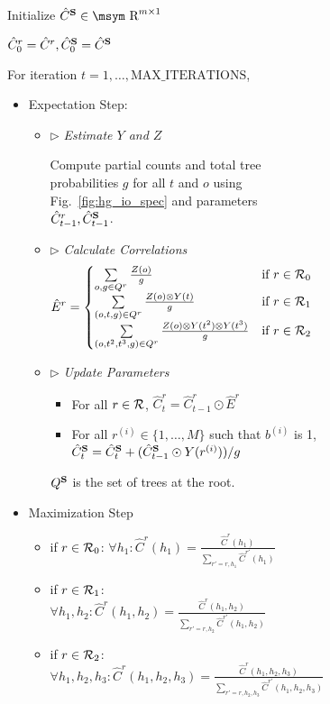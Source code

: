 \documentclass[11pt]{article}
\newcommand{\rione}{r^{(i)}}
\newcommand{\rules}{{\cal R}}
\newcommand{\e}[1]{\hat{#1}}
\newcommand{\bS}{{\bf S}}
\newcommand{\reals}{\mbox{\msym R}}
\begin{document}
\begin{figure*}[t!]
{\begin{footnotesize}
\begin{subfigure}{1.05\columnwidth}
	Initialize $\e{C}^\bS \in \reals^{m \times 1}$ 
	
	$\e{C}_0^r = \e{C}^r, \e{C}_0^\bS = \e{C}^\bS$
	
	For iteration $t=1, \dots, \textrm{MAX\_ITERATIONS}$, 
	\begin{itemize}			
		\item Expectation Step: 
		 \begin{itemize}[label={}]
			\item $\triangleright$ \emph{Estimate $Y$ and $Z$}
			
			Compute partial counts and total tree probabilities $g$ for all $t$ and $o$ using Fig.~\ref{fig:hg_io_spec} and parameters $\e{C}_{t-1}^r, \e{C}_{t-1}^\bS$.  
			\item $\triangleright$ \emph{Calculate Correlations}
				\begin{align*}
					\e{E}^r &= \begin{cases}
					\sum\limits_{o, g \in Q^r} \frac{Z(o)}{g} &\textrm{if }r \in \rules_0 \\
					\sum\limits_{\left(o, t, g\right) \in Q^r} \frac{Z(o) \otimes Y(t)}{g} &\textrm{if }r \in \rules_1 \\
					\sum\limits_{\left(o,t^2,t^3,g\right) \in Q^r} \frac{Z(o) \otimes Y(t^2) \otimes Y(t^3)}{g} &\textrm{if }r \in \rules_2 
					\end{cases}
				\end{align*}
			\item $\triangleright$ \emph{Update Parameters}
		 	\begin{itemize}[label={}]
		 		\item For all $r \in \rules$, $\e{C}^r_t = \e{C}^r_{t-1} \odot \e{E}^r$
		 		\item For all $\rione \in \{1, \dots, M\}$ such that $b^{(i)}$ is 1, $\e{C}^\bS_t = \e{C}^\bS_t + (\e{C}^\bS_{t-1} \odot Y(\rione)) / g $
		 	\end{itemize}
		 	$Q^\bS$ is the set of trees at the root.
		\end{itemize}
		\item Maximization Step
			\begin{itemize}[label={},nolistsep]%
				\item if $r \in \rules_0$: $\forall h_1: \e{C}^r(h_1) = \frac{\e{C}^r(h_1)}{\sum_{r'=r, h_1}\e{C}^{r'}(h_1)}$ 
				\item if $r \in \rules_1$: $\forall h_1, h_2: \e{C}^r(h_1, h_2) = \frac{\e{C}^r(h_1, h_2)}{\sum_{r'=r, h_2}\e{C}^{r'}(h_1, h_2)}$ 
				\item if $r \in \rules_2$: $\forall h_1, h_2, h_3: \e{C}^r(h_1, h_2, h_3) = \frac{\e{C}^r(h_1, h_2, h_3)}{\sum_{r'=r,h_2, h_3}\e{C}^{r'}(h_1, h_2, h_3)}$ 

\end{itemize}
\end{itemize}
\end{subfigure}
\end{footnotesize}}
\end{figure*}
\end{document}
